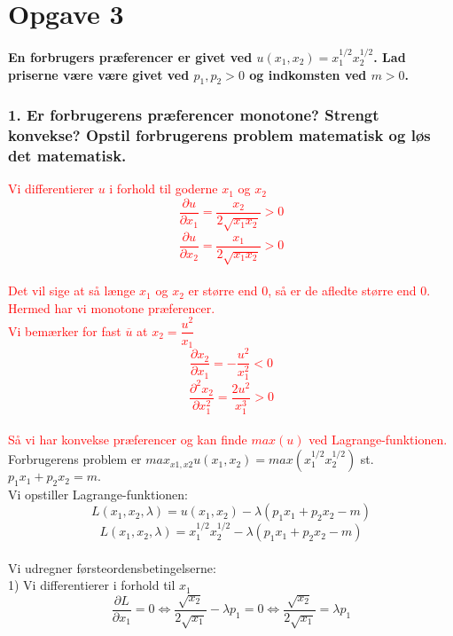 \documentclass[a4paper, 12pt]{article}
\begin{document}

\section*{Opgave 3}
\textbf{En forbrugers præferencer er givet ved $u(x_{1},x_{2}) = x_{1}^{1/2}x_{2}^{1/2}$. Lad priserne være være givet ved $p_{1},p_{2} > 0$ og indkomsten ved $m > 0$.}

\subsubsection*{1. Er forbrugerens præferencer monotone? Strengt konvekse? Opstil forbrugerens problem matematisk og løs det matematisk.}
\textcolor{red}{Vi differentierer $u$ i forhold til goderne $x_{1}$ og $x_{2}$}
\textcolor{red}{$$\dfrac{\partial u}{\partial x_{1}} = \dfrac{x_{2}}{2\sqrt{x_{1}x_{2}}} > 0$$}
\textcolor{red}{$$\dfrac{\partial u}{\partial x_{2}} = \dfrac{x_{1}}{2\sqrt{x_{1}x_{2}}} > 0$$}
\\
\textcolor{red}{Det vil sige at så længe $x_{1}$ og $x_{2}$  er større end $0$, så er de afledte større end $0$. Hermed har vi monotone præferencer.}
\\
\textcolor{red}{Vi bemærker for fast $\overline{u}$ at $x_{2} = \dfrac{u^{2}}{x_{1}}$ }
\textcolor{red}{$$\dfrac{\partial x_{2}}{\partial x_{1}} = -\dfrac{u^{2}}{x_{1}^{2}}< 0$$}
\textcolor{red}{$$\dfrac{\partial ^{2} x_{2}}{\partial x_{1}^{2}} = \dfrac{2u^{2}}{x_{1}^{3}} > 0 $$}
\\
\textcolor{red}{Så vi har konvekse præferencer og kan finde $max(u)$ ved Lagrange-funktionen.}
\\
Forbrugerens problem er $max_{x1,x2}u(x_{1},x_{2}) = max(x_{1}^{1/2}x_{2}^{1/2})$ st. $p_{1}x_{1} + p_{2}x_{2} = m.$
\\
Vi opstiller Lagrange-funktionen:
$$L(x_{1},x_{2}, \lambda) = u(x_{1},x_{2}) - \lambda ( p_{1}x_{1} + p_{2}x_{2} - m)$$
$$L(x_{1},x_{2}, \lambda) = x_{1}^{1/2}x_{2}^{1/2} - \lambda ( p_{1}x_{1} + p_{2}x_{2} - m)$$
\\
Vi udregner førsteordensbetingelserne:\\
1) Vi differentierer i forhold til $x_{1}$
$$\dfrac{\partial L}{\partial x_{1}} = 0 \Leftrightarrow \frac{\sqrt{x_{2}}}{2\sqrt{x_{1}}} - \lambda p_{1} = 0 \Leftrightarrow \frac{\sqrt{x_{2}}}{2\sqrt{x_{1}}} = \lambda p_{1} $$
\\
\end{document}

